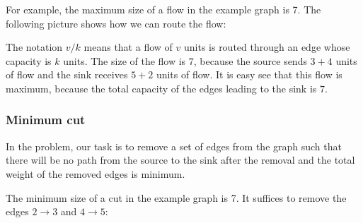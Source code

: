 For example, the maximum size of a flow
in the example graph is 7.
The following picture shows how we can
route the flow:

\begin{center}
\end{center}

The notation $v/k$ means
that a flow of $v$ units is routed through
an edge whose capacity is $k$ units.
The size of the flow is $7$,
because the source sends $3+4$ units of flow
and the sink receives $5+2$ units of flow.
It is easy see that this flow is maximum,
because the total capacity of the edges
leading to the sink is $7$.

\subsubsection{Minimum cut}


In the  problem,
our task is to remove a set
of edges from the graph
such that there will be no path from the source
to the sink after the removal
and the total weight of the removed edges
is minimum.

The minimum size of a cut in the example graph is 7.
It suffices to remove the edges $2 \rightarrow 3$
and $4 \rightarrow 5$:

